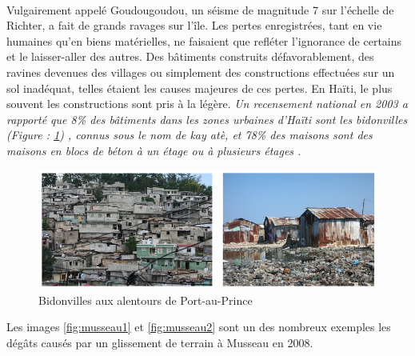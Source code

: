 \paragraph{}
Vulgairement appelé Goudougoudou, un séisme de magnitude 7 sur l'échelle de Richter, 
a fait de grands ravages sur l'île. Les pertes enregistrées, tant en vie humaines qu'en biens
matérielles, ne faisaient que refléter l'ignorance de certains et le laisser-aller des autres. 
Des bâtiments construits défavorablement, des ravines devenues des villages ou simplement des 
constructions effectuées sur un sol inadéquat, telles étaient les causes majeures de ces 
pertes. En Haïti, le plus souvent les constructions sont pris à la légère.
\textit{
    Un recensement national en 2003 a rapporté que 8\% des bâtiments dans les zones urbaines d'Haïti sont
    les bidonvilles (Figure : \ref{fig:bidonville})    
    , connus sous le nom de kay atè, et 78\% des maisons sont 
    des maisons en blocs 
    de béton à un étage ou à plusieurs étages \cite{desroches2011overview}.} 
    \begin{figure}
        \centering
        \includegraphics[width=1\textwidth]{images/Contexte/bidonville.png}
        \caption{Bidonvilles aux alentours de Port-au-Prince  \cite{holly1999problemes}}
        \label{fig:bidonville}
    \end{figure}
Les images \ref{fig:musseau1} et \ref{fig:musseau2} sont un des nombreux exemples les dégâts causés par un 
glissement de terrain à Musseau en 2008.
